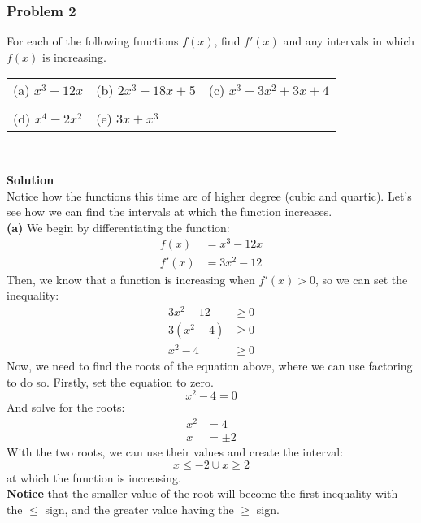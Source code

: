 \documentclass[hidelinks, a4paper, 12pt]{article}
\newcommand{\bd}{\textbf}
\newcommand{\n}{\\[\baselineskip]}
\begin{document}
            \subsubsection{Problem 2}
                For each of the following functions $f(x)$, find $f'(x)$ and any intervals in which $f(x)$ is increasing.
                \begin{center}
                    \begin{tabularx}{\textwidth} {
                        X X X}
                        (a) $x^3-12x$ & (b) $2x^3-18x+5$ & (c) $x^3-3x^2+3x+4$\\
                        \\
                        (d) $x^4-2x^2$ & (e) $3x + x^3$
                    \end{tabularx}\n
                \end{center}
                \bd{Solution}\n
                Notice how the functions this time are of higher degree (cubic and quartic). Let's see how we can find the intervals at which
                the function increases.\n
                \bd{(a)} We begin by differentiating the function:
                \[\begin{split}
                    f(x) &= x^3 - 12x\\
                    f'(x) &= 3x^2 - 12
                \end{split}\]
                Then, we know that a function is increasing when $f'(x) > 0$, so we can set the inequality:
                \[\begin{split}
                    3x^2 - 12 &\geq 0\\
                    3(x^2 - 4) &\geq 0\\
                    x^2 - 4 &\geq 0
                \end{split}\]
                Now, we need to find the roots of the equation above, where we can use factoring to do so. Firstly, set
                the equation to zero.
                \[x^2 - 4 = 0\]
                And solve for the roots:
                \[\begin{split}
                    x^2 &= 4\\
                    x &= \pm 2
                \end{split}\]
                With the two roots, we can use their values and create the interval:
                \[x \leq -2 \cup x \geq 2\]
                at which the function is increasing.\n
                \bd{Notice} that the smaller value of the root will become the first inequality with the $\leq$ sign, and the greater value having the $\geq$ sign.\n
\end{document}
